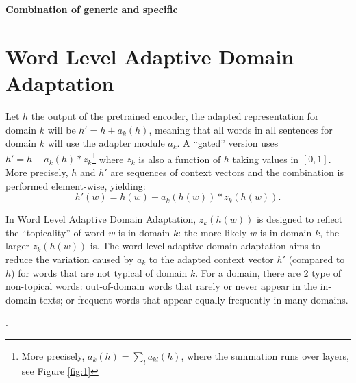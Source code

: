 \documentclass[12pt,a4paper,twoside]{report}
\theoremstyle{definition}
\newcommand{\fyTodo}[1]{\Todo[FY:]{\textcolor{orange}{#1}}}
\begin{document}
\begin{center}
{\LARGE \bf Combination of generic and specific}\\
\end{center}
\setlength{\belowdisplayskip}{8pt} \setlength{\belowdisplayshortskip}{8pt}
\setlength{\abovedisplayskip}{8pt} \setlength{\abovedisplayshortskip}{8pt}
\setlength{\parskip}{0.1cm}
\setlength{\parindent}{1em}
\section*{Word Level Adaptive Domain Adaptation}
Let $h$ the output of the pretrained encoder, the adapted representation for domain $k$ will be $h' = h + a_k(h)$, meaning that all words in all sentences for domain $k$ will use the adapter module $a_k$.  A ``gated'' version uses $h' = h + a_k(h) * z_k$\footnote{More precisely, $a_k(h) = \sum_{l} a_{kl}(h)$, where the summation runs over layers, see Figure \ref{fig:1}} \fyTodo{$a_k(h)=$ somme tous les composants résiduels} where $z_k$ is also a function of $h$ taking values in $[0,1]$. More precisely, $h$ and $h'$ are sequences of context vectors and the combination is performed element-wise, yielding:
\begin{equation}
  h'(w) = h(w) + a_k(h(w)) * z_k(h(w)). \label{eq:gated-residual}
\end{equation}

In Word Level Adaptive Domain Adaptation, $z_k(h(w))$ is designed to reflect the ``topicality'' of  word $w$ is in domain $k$: the more likely $w$ is in domain $k$, the larger $z_k(h(w))$ is. The word-level adaptive domain adaptation aims to reduce the variation caused by $a_k$ to the adapted context vector $h'$ (compared to $h$) for words that are not typical of domain $k$. For a domain, there are 2 type of non-topical words: out-of-domain words that rarely or never appear in the in-domain texts; or frequent words that appear equally frequently in many domains. \fyTodo{This is like a poor Tf-idf - can be because tf is small or because idf is small} 

\fyTodo{Experiment: compute posterior probability of words that have poor $tf-idf$ to verify the gating operation}. 
\end{document}
